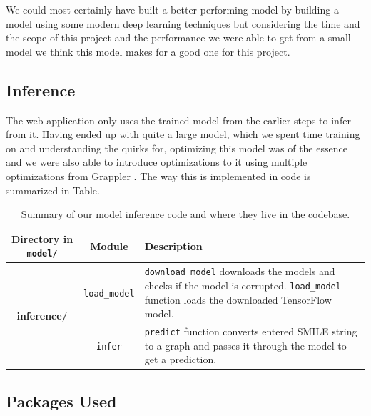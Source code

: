 \documentclass[fontsize=11pt]{article}
\begin{document}
We could most certainly have built a better-performing model by building a model using some modern deep learning techniques but considering the time and the scope of this project and the performance we were able to get from a small model we think this model makes for a good one for this project.

\subsection*{Inference}

The web application only uses the trained model from the earlier steps to infer from it. Having ended up with quite a large model, which we spent time training on and understanding the quirks for, optimizing this model was of the essence and we were also able to introduce optimizations to it using multiple optimizations from Grappler \citep{48051}. The way this is implemented in code is summarized in Table.

\begin{table}[ht]
\centering
\caption{Summary of our model inference code and where they live in the codebase.}
\label{tab:train}
\begin{tabularx}{\textwidth}{ccX}
\toprule
\textbf{Directory in \texttt{model/}} & \textbf{Module} & \textbf{Description}\\
\midrule
\multirow{2}{*}{\textbf{inference/}} & \texttt{load\_model} &\texttt{download\_model} downloads the models and checks if the model is corrupted. \texttt{load\_model} function loads the downloaded TensorFlow model.\\
\midrule
\multirow{2}{*}{\textbf{inference/}} & \texttt{infer} &\texttt{predict} function converts entered SMILE string to a graph and passes it through the model to get a prediction.\\
\bottomrule
\end{tabularx}
\end{table}

\subsection*{Packages Used}
\end{document}
